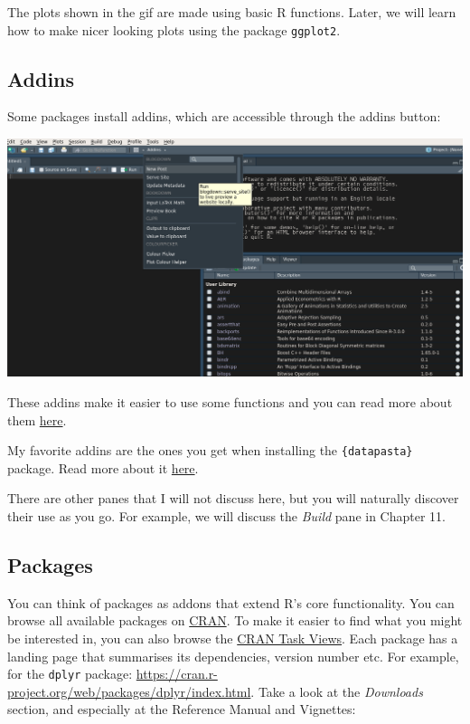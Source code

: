 \documentclass[]{gitbook}
\begin{document}
The plots shown in the gif are made using basic R functions. Later, we will learn how to make nicer
looking plots using the package \texttt{ggplot2}.

\hypertarget{addins}{%
\subsection{Addins}\label{addins}}

Some packages install addins, which are accessible through the addins button:

\includegraphics[width=17.08in]{pics/rstudio_addins}

These addins make it easier to use some functions and you can read more about them \href{https://rstudio.github.io/rstudioaddins/\#overview}{here}.

My favorite addins are the ones you get when installing the \texttt{\{datapasta\}} package. Read more about
it \href{https://github.com/MilesMcBain/datapasta}{here}.

There are other panes that I will not discuss here, but you will naturally discover their use as you
go. For example, we will discuss the \emph{Build} pane in Chapter 11.

\hypertarget{packages}{%
\subsection{Packages}\label{packages}}

You can think of packages as addons that extend R's core functionality. You can browse all available
packages on \href{https://cloud.r-project.org/}{CRAN}. To make it easier to find what you might be
interested in, you can also browse the \href{https://cloud.r-project.org/web/views/}{CRAN Task Views}.
Each package has a landing page that summarises its dependencies, version number etc. For example,
for the \texttt{dplyr} package: \url{https://cran.r-project.org/web/packages/dplyr/index.html}.
Take a look at the \emph{Downloads} section, and especially at the Reference Manual and Vignettes:
\end{document}
